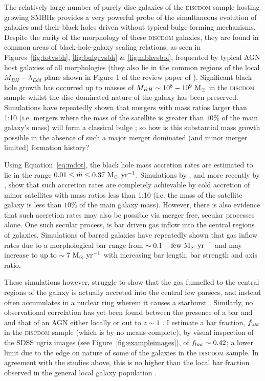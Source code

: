 {The relatively large number of purely disc galaxies of the \textsc{discdom} sample hosting growing SMBHs provides a very powerful probe of the simultaneous evolution of galaxies and their black holes driven without typical bulge-forming mechanisms. Despite the rarity of the morphology of these \textsc{discdom} galaxies, they are found in common areas of black-hole-galaxy scaling relations, as seen in Figures~\ref{fig:totvsbh}, \ref{fig:bulgevsbh} \& \ref{fig:mbhvsbol}, frequented by typical AGN host galaxies of all morphologies (they also lie in the common regions of the local $M_{BH}-\lambda_{Edd}$ plane shown in Figure 1 of the review paper of \citealt{alexander12}). Significant black hole growth has occurred up to masses of $M_{BH}\sim10^8 - 10^9~\rm{M}_{\odot}$ in the \textsc{discdom} sample whilst the disc dominated nature of the galaxy has been preserved. Simulations have repeatedly shown that mergers with mass ratios larger than 1:10 (i.e. mergers where the mass of the satellite is greater than $10\%$ of the main galaxy's mass) will form a classical bulge \citep{walker96, hopkins11c, tonini16}; so how is this substantial mass growth possible in the absence of such a major merger dominated (and minor merger limited) formation history?

Using Equation~\ref{eq:mdot}, the black hole mass accretion rates are estimated to lie in the range $0.01 \leq \dot{m} \leq 0.37 ~\rm{M}_{\odot}~\rm{yr}^{-1}$. Simulations by \citet{crockett11}, and more recently by \citet{diteodoro14}, show that such accretion rates are completely achievable by cold accretion of minor satellites with mass ratios less than 1:10 (i.e. the mass of the satellite galaxy is less than $10\%$ of the main galaxy mass). However, there is also evidence that such accretion rates may also be possible via merger free, secular processes alone. One such secular process, is bar driven gas inflow into the central regions of galaxies. Simulations of barred galaxies have repeatedly shown that gas inflow rates due to a morphological bar range from $\sim0.1-\rm{few} ~\rm{M}_{\odot}~\rm{yr}^{-1}$ \citep{sakamoto96, maciejewski02, regan04, lin13} and may increase to up to $\sim 7 ~\rm{M}_{\odot}~\rm{yr}^{-1}$ \citep{friedli93} with increasing bar length, bar strength and axis ratio. 

These simulations however, struggle to show that the gas funnelled to the central regions of the galaxy is actually accreted into the central few parsecs, and instead often accumulates in a nuclear ring wherein it causes a starburst \citep{regan04}. Similarly, no observational correlation has yet been found between the presence of a bar and and that of an AGN either locally \citep{ho97, malkan98, erwin02, lee12,cisternas13} or out to $z\sim1$ \citep{cheung15}. I estimate a bar fraction, $f_{\rm{bar}}$ in the \textsc{discdom} sample (which is by no means complete), by visual inspection of the SDSS ugriz images (see Figure~\ref{fig:exampleimages}), of $f_{\rm{bar}} \sim 0.42$; a lower limit due to the edge on nature of some of the galaxies in the \textsc{discdom} sample. In agreement with the studies above, this is no higher than the local bar fraction observed in the general local galaxy population \citep{masters11a}.

}
